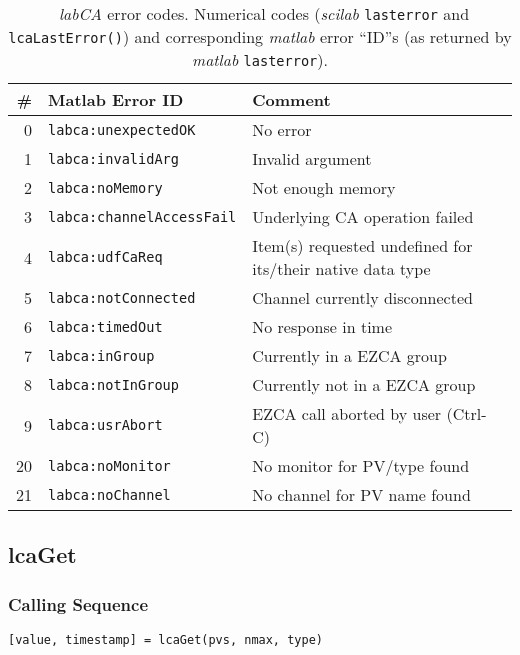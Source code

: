 \documentclass{article}
\newcommand{\sca}{\ita{labCA}}
\newcommand{\scilab}{\ita{scilab}}
\newcommand{\matlab}{\ita{matlab}}
\newcommand{\com}[1]{{\tt #1}}
\newcommand{\pbrk}{\pagebreak[3]}
\newcommand{\ita}[1]{\emph{#1}}
\renewcommand{\pbrk}{}
\begin{document}
\begin{table}[h]
\begin{tabular}{r|l|p{5.5cm}}
	\#                   &      Matlab Error ID         & Comment \\
	\hline
	0                    & \com{labca:unexpectedOK}     & No error \\
    1                    & \com{labca:invalidArg}       & Invalid argument \\
    2                    & \com{labca:noMemory}         & Not enough memory \\
    3                    & \com{labca:channelAccessFail}& Underlying CA operation failed \\
    4                    & \com{labca:udfCaReq}         & Item(s) requested undefined for its/their native data type\\
    5                    & \com{labca:notConnected}     & Channel currently disconnected\\
    6                    & \com{labca:timedOut}         & No response in time \\
    7                    & \com{labca:inGroup}          & Currently in a EZCA group\\
    8                    & \com{labca:notInGroup}       & Currently not in a EZCA group\\
    9                    & \com{labca:usrAbort}         & EZCA call aborted by user (Ctrl-C) \\
    20                   & \com{labca:noMonitor}        & No monitor for PV/type found\\
    21                   & \com{labca:noChannel}        & No channel for PV name found\\
\end{tabular}
\caption{~\sca{} error codes. Numerical codes (\scilab{} \com{lasterror} and
\com{lcaLastError()}) and corresponding \matlab{} error ``ID''s
(as returned by \matlab{} \com{lasterror}).}
\label{tbl:errors}
\end{table}


\vspace*{\fill}
\pbrk
\subsection{lcaGet}
\label{lcaget}
\subsubsection{Calling Sequence}
\begin{verbatim}
[value, timestamp] = lcaGet(pvs, nmax, type)
\end{verbatim}
\end{document}
